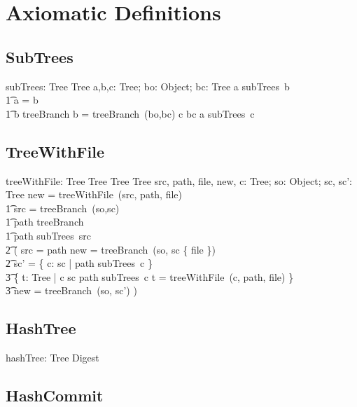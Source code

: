 \section{Axiomatic Definitions}

\subsection{SubTrees}

\begin{axdef}
  subTrees: Tree \pfun \finset Tree
\where
  \exists a,b,c: Tree; bo: Object; bc: \finset Tree \spot a \in subTrees~b \iff \\
  \t1 a = b \lor \\
  \t1 b \in \ran treeBranch \land b = treeBranch~(bo,bc) \land c \in bc \land a \in subTrees~c
\end{axdef}

\subsection{TreeWithFile}

\begin{axdef}
  treeWithFile: Tree \cross Tree \cross Tree \pfun Tree
\where
  \exists src, path, file, new, c: Tree; so: Object; sc, sc': \finset Tree \spot new = treeWithFile~(src, path, file) \iff \\
  \t1 src = treeBranch~(so,sc) \land \\
  \t1 path \in \ran treeBranch \land \\
  \t1 path \in subTrees~src \land \\
    \t2 ( src = path \land new = treeBranch~(so, sc \cup \{ file \}) \lor \\
    \t2 sc' = \{ c: sc | path \notin subTrees~c \} \cup \\
      \t3 \{ t: Tree | c \in sc \land path \in subTrees~c \land t = treeWithFile~(c, path, file) \} \land \\
      \t3 new = treeBranch~(so, sc') )
\end{axdef}

\subsection{HashTree}

\begin{axdef}
  hashTree: Tree \surj Digest
\end{axdef}

\subsection{HashCommit}

